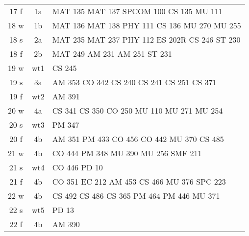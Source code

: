 \documentclass[convert]{standalone}
\newcommand{\opw}[1]{{\color{white}#1}}
\begin{document}
\begin{tabular}{|c | c | l |}
	\hline
	17 f & 1a & MAT 135 \quad MAT 137 \quad SPCOM 100 \quad CS 135 \quad MU 111 \\
	18 w & 1b & MAT 136 \quad MAT 138 \quad PHY 111 \quad CS 136 \quad MU 270 \quad MU 255\\
	18 s & 2a & MAT 235 \quad MAT 237 \quad PHY 112 \quad ES 202R \quad CS 246 \quad ST  230 \\
	18 f & 2b & MAT 249 \quad AM 231 \quad AM 251 \quad ST  231 \\
	19 w & wt1 & CS 245 \\
	19 s & 3a & AM 353 \quad CO 342 \quad CS 240 \quad CS 241 \quad CS 251 \quad CS 371 \\
	19 f & wt2 & AM 391 \\
	20 w & 4a & CS 341 \quad CS 350 \quad CO 250  \quad MU 110 \quad MU 271 \quad MU 254 \\
	20 s & wt3 & PM 347 \\
	20 f & 4b & AM 351  \quad PM 433  \quad CO 456 \quad CO 442  \quad MU 370 \quad CS 485 \\
	21 w & 4b & CO 444 \quad PM 348   \quad \opw{MU 371}   \quad MU 390 \quad MU 256 \quad SMF 211 \\
	21 s & wt4 & CO 446 \quad PD 10  \\
	21 f & 4b &{\color{white} CO 351} \quad EC 212  \quad AM 453 \quad CS 466 \quad MU 376 \quad SPC 223    \\
	22 w & 4b & CS 492 \quad CS 486 \quad CS 365 \quad PM 464 \quad PM 446 \quad MU 371    \\
	22 s & wt5 & PD 13 \\
	22 f & 4b &  AM 390   \\\hline

\end{tabular}
\end{document}
